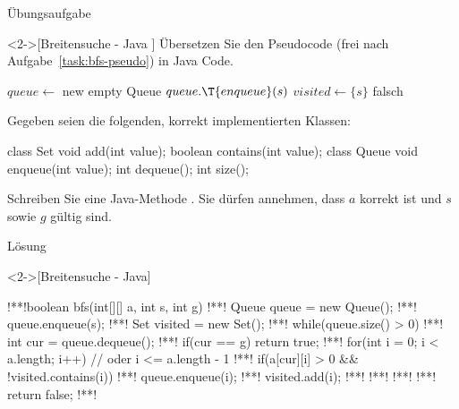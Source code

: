 \begin{frame}[fragile,c]{Übungsaufgabe}
    \begin{exercise}<2->[Breitensuche - Java ]
        \pause{}Übersetzen Sie den Pseudocode (frei nach Aufgabe~\ref{task:bfs-pseudo}) in Java Code.
\par\pause
{}%
%
%
%
%
\begin{minipage}{.5\linewidth}\scriptsize{}\SetAlgoVlined%
\begin{algorithm}[H]
\PreCode\StartCode
\(queue \leftarrow\) new empty Queue\;
\(queue.\T{enqueue}(s)\)\;
\(visited \leftarrow \{s\}\)\;
\KwRet falsch\;
\end{algorithm}\end{minipage}\hfill\begin{minipage}{.465\linewidth}%
    \pause{}Gegeben seien die folgenden, korrekt implementierten Klassen:\pause
\begin{plainjava}
class Set {
  void add(int value);
  boolean contains(int value);
}
class Queue {
  void enqueue(int value);
  int dequeue();
  int size();
}
\end{plainjava}
\end{minipage}\par
Schreiben Sie eine Java-Methode . Sie dürfen annehmen, dass \(a\) korrekt ist und \(s\) sowie \(g\) gültig sind.
    \end{exercise}
\end{frame}

\begin{frame}[fragile,c]{Lösung}
    \begin{solve}<2->[Breitensuche - Java]
\begin{plainjava}[morekeywords={[4]{enqueue,dequeue,contains,add,size}}]
!**!boolean bfs(int[][] a, int s, int g) {
!**!    Queue queue = new Queue();
!**!    queue.enqueue(s);
!**!    Set visited = new Set();
!**!    while(queue.size() > 0) {
!**!        int cur = queue.dequeue();
!**!        if(cur == g) return true;
!**!        for(int i = 0; i < a.length; i++) { // oder i <= a.length - 1
!**!            if(a[cur][i] > 0 && !visited.contains(i)) {
!**!                queue.enqueue(i);
!**!                visited.add(i);
!**!            }
!**!        }
!**!    }
!**!    return false;
!**!}
\end{plainjava}
    \end{solve}
\end{frame}
\fi